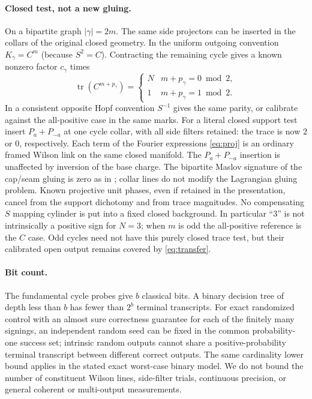 \documentclass[11pt]{article}
\newcommand{\Tr}{\operatorname{tr}}
\begin{document}
\paragraph{Closed test, not a new gluing.}
On a bipartite graph \(|\gamma|=2m\). The same side projectors can be inserted in the collars of the original closed geometry. In the uniform outgoing convention \(K_\gamma=C^m\) (because \(S^2=C\)). Contracting the remaining cycle gives a known nonzero factor \(c_\gamma\) times
\[
 \Tr(C^{m+p_\gamma})=\begin{cases}N&m+p_\gamma=0\bmod2,\\1&m+p_\gamma=1\bmod2.\end{cases}
\]
In a consistent opposite Hopf convention \(S^{-1}\) gives the same parity, or calibrate against the all-positive case in the same marks. For a literal closed support test insert \(P_a+P_{-a}\) at one cycle collar, with all side filters retained: the trace is now \(2\) or \(0\), respectively. Each term of the Fourier expressions \eqref{eq:proj} is an ordinary framed Wilson link on the same closed manifold. The \(P_a+P_{-a}\) insertion is unaffected by inversion of the base charge. The bipartite Maslov signature of the cap/seam gluing is zero as in \cite{p50b}; collar lines do not modify the Lagrangian gluing problem. Known projective unit phases, even if retained in the presentation, cancel from the support dichotomy and from trace magnitudes. No compensating \(S\) mapping cylinder is put into a fixed closed background. In particular “3” is not intrinsically a positive sign for \(N=3\); when \(m\) is odd the all-positive reference is the \(C\) case. Odd cycles need not have this purely closed trace test, but their calibrated open output remains covered by \eqref{eq:transfer}.

\paragraph{Bit count.}
The fundamental cycle probes give \(b\) classical bits. A binary decision tree of depth less than \(b\) has fewer than \(2^b\) terminal transcripts. For exact randomized control with an almost sure correctness guarantee for each of the finitely many signings, an independent random seed can be fixed in the common probability-one success set; intrinsic random outputs cannot share a positive-probability terminal transcript between different correct outputs. The same cardinality lower bound applies in the stated exact worst-case binary model. We do not bound the number of constituent Wilson lines, side-filter trials, continuous precision, or general coherent or multi-output measurements.
\end{document}

